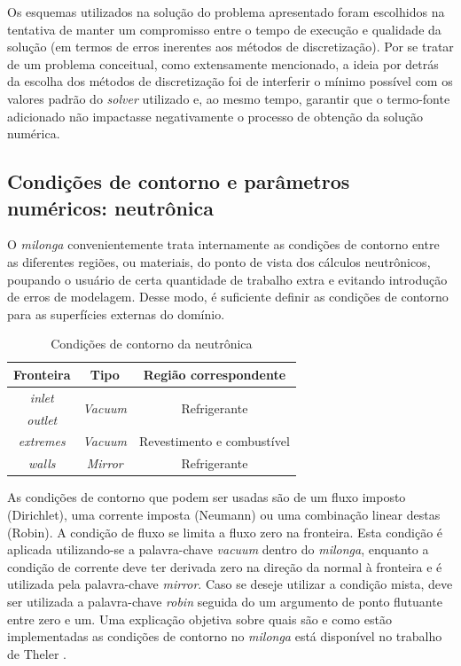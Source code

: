 Os esquemas utilizados na solução do problema apresentado foram escolhidos na tentativa de manter
um compromisso entre o tempo de execução e qualidade da solução (em termos de erros inerentes
aos métodos de discretização). Por se tratar de um problema conceitual, como extensamente mencionado,
a ideia por detrás da escolha dos métodos de discretização foi de interferir o mínimo possível com
os valores padrão do \textit{solver} utilizado e, ao mesmo tempo, garantir que o termo-fonte
adicionado não impactasse negativamente o processo de obtenção da solução numérica.


\subsection{Condições de contorno e parâmetros numéricos: neutrônica}
\label{ssec:neutro}

O \textit{milonga} convenientemente trata internamente as condições de contorno
entre as diferentes regiões, ou materiais, do ponto de vista dos cálculos neutrônicos,
poupando o usuário de certa quantidade de trabalho extra e evitando introdução
de erros de modelagem. Desse modo, é suficiente definir as condições de contorno
para as superfícies externas do domínio.

\begin{table}[htb]
  \centering
\caption{Condições de contorno da neutrônica}
\label{tab:cc-neut}
\begin{tabular}{ccc}
Fronteira         & Tipo                             & Região correspondente         \\ \hline
\textit{inlet}    & \multirow{2}{*}{\textit{Vacuum}} & \multirow{2}{*}{Refrigerante} \\
\textit{outlet}   &                                  &                               \\ \cline{1-1}
\textit{extremes} & \textit{Vacuum}                  & Revestimento e combustível    \\ \hline
\textit{walls}    & \textit{Mirror}                  & Refrigerante                 
\end{tabular}
\end{table}

As condições de contorno que podem ser usadas são de um fluxo imposto (Dirichlet),
uma corrente imposta (Neumann) ou uma combinação linear destas (Robin). A condição de
fluxo se limita a fluxo zero na fronteira. Esta condição é aplicada utilizando-se
a palavra-chave \textit{vacuum} dentro do \textit{milonga}, enquanto a condição
de corrente deve ter derivada zero na direção da normal à fronteira e é utilizada
pela palavra-chave \textit{mirror}. Caso se deseje utilizar a condição mista, deve
ser utilizada a palavra-chave \textit{robin} seguida do um argumento de ponto
flutuante entre zero e um. Uma explicação objetiva sobre quais são e como estão
implementadas as condições de contorno no \textit{milonga} está disponível
no trabalho de Theler \cite{Theler2013b}.

